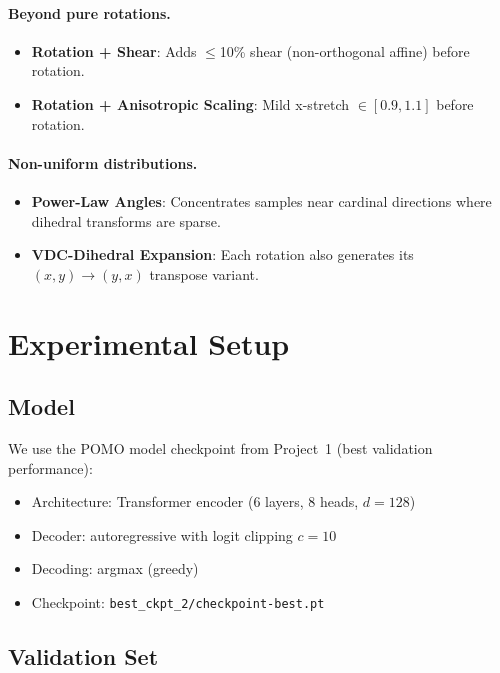 \documentclass[11pt,a4paper]{article}
\begin{document}
\paragraph{Beyond pure rotations.}
\begin{itemize}
  \item \textbf{Rotation + Shear}: Adds $\leq$10\% shear (non-orthogonal
        affine) before rotation.
  \item \textbf{Rotation + Anisotropic Scaling}: Mild x-stretch $\in [0.9,
        1.1]$ before rotation.
\end{itemize}

\paragraph{Non-uniform distributions.}
\begin{itemize}
  \item \textbf{Power-Law Angles}: Concentrates samples near cardinal
        directions where dihedral transforms are sparse.
  \item \textbf{VDC-Dihedral Expansion}: Each rotation also generates its
        $(x,y) \to (y,x)$ transpose variant.
\end{itemize}

\section{Experimental Setup}
\label{sec:setup}

\subsection{Model}

We use the POMO model checkpoint from Project~1 (best validation performance):
\begin{itemize}
  \item Architecture: Transformer encoder (6 layers, 8 heads, $d=128$)
  \item Decoder: autoregressive with logit clipping $c=10$
  \item Decoding: argmax (greedy)
  \item Checkpoint: \texttt{best\_ckpt\_2/checkpoint-best.pt}
\end{itemize}

\subsection{Validation Set}
\end{document}
